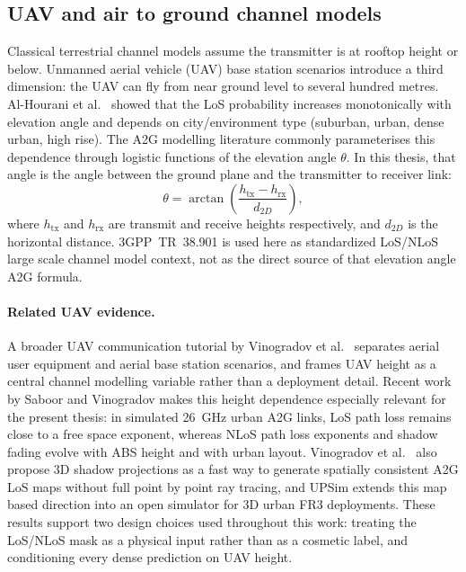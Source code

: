 \subsection{UAV and air to ground channel models}

Classical terrestrial channel models assume the transmitter is at rooftop height
or below.  Unmanned aerial vehicle (UAV) base station scenarios introduce a
third dimension: the UAV can fly from near ground level to several hundred
metres.  Al-Hourani et al.~\cite{alhourani2014} showed that the LoS probability
increases monotonically with elevation angle and depends on city/environment type
(suburban, urban, dense urban, high rise).  The A2G modelling literature
\cite{alhourani2014,khawaja_survey} commonly parameterises this dependence
through logistic functions of the elevation angle \(\theta\). In this thesis,
that angle is the angle between the ground plane and the transmitter to
receiver link:
\begin{equation}
  \theta =
  \arctan\!\left(
    \frac{h_{\mathrm{tx}} - h_{\mathrm{rx}}}{d_{2D}}
  \right),
  \label{eq:a2g_elevation_angle}
\end{equation}
where \(h_{\mathrm{tx}}\) and \(h_{\mathrm{rx}}\) are transmit and receive
heights respectively, and \(d_{2D}\) is the horizontal distance. 3GPP~TR~38.901
\cite{tr38901} is used here as standardized LoS/NLoS large scale channel model
context, not as the direct source of that elevation angle A2G formula.

\paragraph{Related UAV evidence.}
A broader UAV communication tutorial by Vinogradov et al.\
\cite{vinogradov2018uavtutorial} separates aerial user equipment and aerial
base station scenarios, and frames UAV height as a central channel modelling
variable rather than a deployment detail. Recent work by Saboor and Vinogradov
\cite{saboor2025height} makes this height dependence especially relevant for
the present thesis: in simulated 26~GHz urban A2G links, LoS path loss remains
close to a free space exponent, whereas NLoS path loss exponents and shadow
fading evolve with ABS height and with urban layout. Vinogradov et al.\
\cite{vinogradov2026shadow} also propose 3D shadow projections as a fast way
to generate spatially consistent A2G LoS maps without full point by point ray
tracing, and UPSim \cite{vinogradov2026upsim} extends this map based direction
into an open simulator for 3D urban FR3 deployments. These results support two
design choices used throughout this work: treating the LoS/NLoS mask as a
physical input rather than as a cosmetic label, and conditioning every dense
prediction on UAV height.


